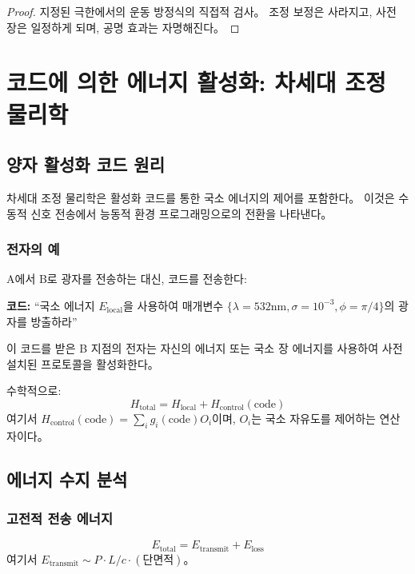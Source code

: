 \documentclass[11pt,a4paper]{article}
\begin{document}
\begin{proof}
지정된 극한에서의 운동 방정식의 직접적 검사。 조정 보정은 사라지고, 사전 장은 일정하게 되며, 공명 효과는 자명해진다。
\end{proof}

\section{코드에 의한 에너지 활성화: 차세대 조정 물리학}
\label{sec:energy-activation}

\subsection{양자 활성화 코드 원리}

차세대 조정 물리학은 활성화 코드를 통한 국소 에너지의 제어를 포함한다。 이것은 수동적 신호 전송에서 능동적 환경 프로그래밍으로의 전환을 나타낸다。

\subsubsection{전자의 예}
A에서 B로 광자를 전송하는 대신, 코드를 전송한다:

\textbf{코드:} ``국소 에너지 $E_{\text{local}}$을 사용하여 매개변수 $\{\lambda=532\text{nm}, \sigma=10^{-3}, \phi=\pi/4\}$의 광자를 방출하라''

이 코드를 받은 B 지점의 전자는 자신의 에너지 또는 국소 장 에너지를 사용하여 사전 설치된 프로토콜을 활성화한다。

수학적으로:
\begin{equation}
H_{\text{total}} = H_{\text{local}} + H_{\text{control}}(\text{code})
\end{equation}
여기서 $H_{\text{control}}(\text{code}) = \sum_i g_i(\text{code}) O_i$이며, $O_i$는 국소 자유도를 제어하는 연산자이다。

\subsection{에너지 수지 분석}

\subsubsection{고전적 전송 에너지}
\begin{equation}
E_{\text{total}} = E_{\text{transmit}} + E_{\text{loss}}
\end{equation}
여기서 $E_{\text{transmit}} \sim P \cdot L/c \cdot (\text{단면적})$。
\end{document}
